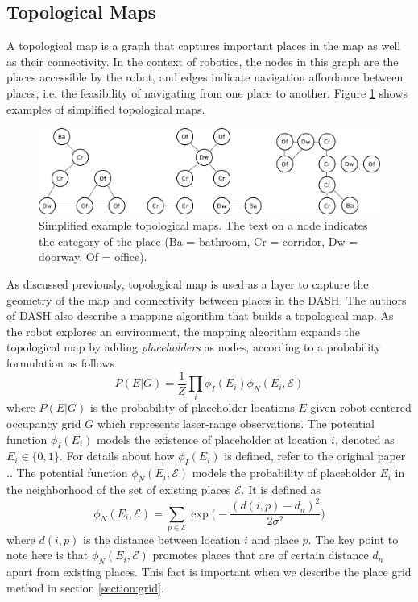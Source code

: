 \documentclass[10pt, titlepage]{article}
\theoremstyle{definition}
\begin{document}
\subsection{Topological Maps}\label{section:topomap}

A topological map is a graph that captures important places in the map as well as their connectivity. In the context of robotics, the nodes in this graph are the places accessible by the robot, and edges indicate navigation affordance between places, i.e. the feasibility of navigating from one place to another. Figure \ref{fig:topomap} shows examples of simplified topological maps.
\begin{figure}[!htb]
    \centering
    \captionsetup{width=.8\linewidth}
    \includegraphics[scale=0.5]{images/example_place_maps.png}
    \caption{Simplified example topological maps. The text on a node indicates the category of the place (Ba = bathroom, Cr = corridor, Dw = doorway, Of = office).}
    \label{fig:topomap}
\end{figure}

As discussed previously, topological map is used as a layer to capture the geometry of the map and connectivity between places in the DASH. The authors of DASH \cite{pronobis2017deep} also describe a mapping algorithm that builds a topological map. As the robot explores an environment, the mapping algorithm expands the topological map by adding \textit{placeholders} \cite{pronobis2010representing} as nodes, according to a probability formulation as follows
\begin{equation}\label{eq:p_eg}
  P(E|G) = \frac{1}{Z}\prod_i\phi_I(E_i)\phi_N(E_i, \mathcal{E})
\end{equation}
where $P(E|G)$ is the probability of placeholder locations $E$ given robot-centered occupancy grid $G$ which represents laser-range observations. The potential function $\phi_I(E_i)$ models the existence of placeholder at location $i$, denoted as $E_i\in\{0,1\}$. For details about how $\phi_I(E_i)$ is defined, refer to the original paper \cite{pronobis2017deep}.. The potential function $\phi_N(E_i, \mathcal{E})$ models the probability of placeholder $E_i$ in the neighborhood of the set of existing places $\mathcal{E}$. It is defined as
\begin{equation}\label{eq:phi_n}
  \phi_N(E_i, \mathcal{E}) = \sum_{p\in\mathcal{E}}\exp\Big(-\frac{(d(i,p)-d_n)^2}{2\sigma^2}\Big)
\end{equation}
where $d(i,p)$ is the distance between location $i$ and place $p$. The key point to note here is that $\phi_N(E_i, \mathcal{E})$ promotes places that are of certain distance $d_n$ apart from existing places. This fact is important when we describe the place grid method in section \ref{section:grid}.
\end{document}
